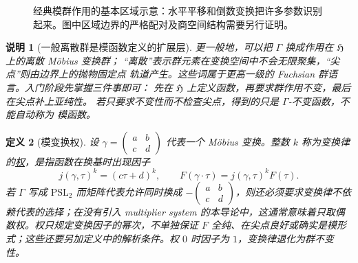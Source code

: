 \documentclass[UTF8,fontset=none,a4paper,11pt]{ctexart}
\theoremstyle{foundation-definition}
\newtheorem{definition}{定义}[section]
\theoremstyle{foundation-theorem}
\theoremstyle{foundation-proposition}
\theoremstyle{foundation-example}
\theoremstyle{foundation-remark}
\newtheorem{remark}[definition]{说明}
\theoremstyle{foundation-theorem}
\newcommand{\term}[2]{\hyperref[#1]{#2}}
\begin{document}
\begin{figure}[htbp]
\centering
{}
\caption{经典模群作用的基本区域示意：水平平移和倒数变换把许多参数识别起来。图中区域边界的严格配对及商空间结构需要另行证明。}
\label{fig:modular-fundamental-domain}
\end{figure}

\begin{remark}[一般离散群是模函数定义的扩展层]
更一般地，可以把 \(\Gamma\) 换成作用在 \(\mathfrak H\) 上的离散 Möbius 变换群；
“离散”表示群元素在变换空间中不会无限聚集，“尖点”则由边界上的抛物固定点
轨道产生。这些词属于更高一级的 Fuchsian 群语言。入门阶段先掌握三件事即可：
先在 \(\mathfrak H\) 上定义函数，再要求群作用不变，最后在尖点补上亚纯性。
若只要求不变性而不检查尖点，得到的只是 \(\Gamma\)-不变函数，不能自动称为
模函数。
\end{remark}

\begin{definition}[模变换权]\label{def:modular-weight}
设 \(\gamma=\begin{pmatrix}a&b\\c&d\end{pmatrix}\) 代表一个 Möbius 变换。整数 \(k\) 称为变换律的\term{def:modular-weight}{权}，是指函数在换基时出现因子
\[
j(\gamma,\tau)^k=(c\tau+d)^k,
\qquad
F(\gamma\cdot\tau)=j(\gamma,\tau)^kF(\tau).
\]
若 \(\Gamma\) 写成 \(\mathrm{PSL}_2\) 而矩阵代表允许同时换成 \(-\begin{pmatrix}a&b\\c&d\end{pmatrix}\)，则还必须要求变换律不依赖代表的选择；在没有引入 multiplier system 的本导论中，这通常意味着只取偶数权。权只规定变换因子的幂次，不单独保证 \(F\) 全纯、在尖点良好或确实是模形式；这些还要另加定义中的解析条件。权 \(0\) 时因子为 \(1\)，变换律退化为群不变性。
\end{definition}
\end{document}
